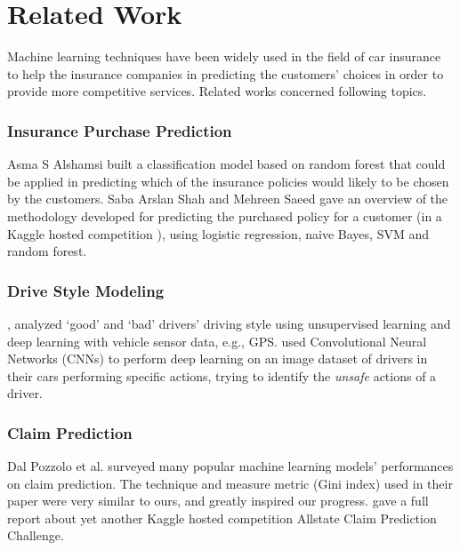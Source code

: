 \documentclass{standalone}
\begin{document}
\section{Related Work}\label{related}

Machine learning techniques have been widely used in the field of car insurance to help the insurance companies in predicting the customers' choices in order to provide more competitive services. Related works concerned following topics.

\subsubsection{Insurance Purchase Prediction}

Asma S Alshamsi \cite{alshamsi2014predicting} built a classification model based on random forest that could be applied in predicting which of the insurance policies would likely to be chosen by the customers. Saba Arslan Shah and Mehreen Saeed \cite{shahpredicting} gave an overview of the methodology developed for predicting the purchased policy for a
customer (in a Kaggle hosted competition \cite{kaggle:allstatepurchase}), using logistic regression, naive Bayes, SVM and random forest.

\subsubsection{Drive Style Modeling}
\cite{dong2016characterizing}, \cite{nikulin2016driving} analyzed `good' and `bad' drivers' driving style using unsupervised learning and deep learning with vehicle
sensor data, e.g., GPS.
\cite{singhusing} used Convolutional Neural Networks
(CNNs) to perform deep learning on an image dataset  of drivers in their
cars performing specific actions, trying to identify the \emph{unsafe} actions of a driver.

\subsubsection{Claim Prediction}

Dal Pozzolo et al. \cite{dal2010comparison} surveyed many popular machine learning models' performances on claim prediction. The technique and measure metric (Gini index) used in their paper were very similar to ours, and greatly inspired our progress. \cite{huangfu2015data} gave a full report about yet another Kaggle hosted competition Allstate Claim Prediction Challenge\cite{kaggle:allstate}.
\end{document}
